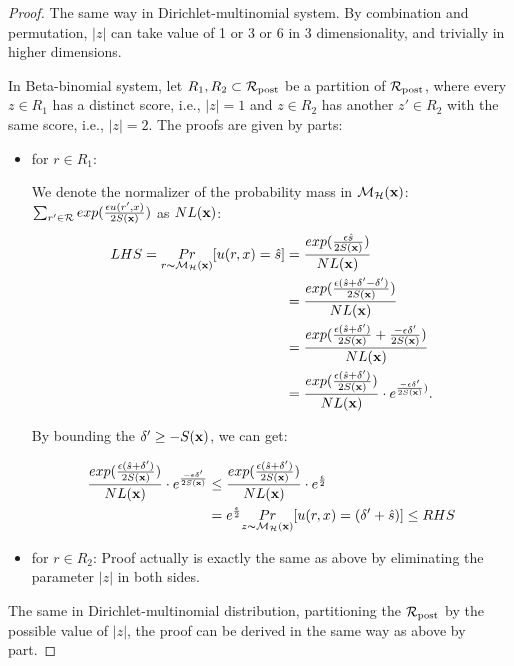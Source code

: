 \documentclass{article}
\begin{document}
\begin{proof}
 The same way in Dirichlet-multinomial system. By combination and permutation, $|z|$ can take value of 1 or 3 or 6 in 3 dimensionality, and trivially in higher dimensions.

 In Beta-binomial system, let $R_1, R_2 \subset \mathcal{R}_{\textup{post}}$ be a partition of $\mathcal{R}_{\textup{post}}$, where every $z \in R_1$ has a distinct score, i.e., $|z| = 1$ and $z \in R_2$ has another $z' \in R_2$ with the same score, i.e., $|z| = 2$. The proofs are given by parts: 

 \begin{itemize}
 	\item for $r \in R_1$:

		We denote the normalizer of the probability mass in $\mathcal{M}_{\mathcal{H}}(\textbf{x})$: $\sum_{r' \in \mathcal{R}}exp(\frac{\epsilon u(r',x)}{2 S(\textbf{x})})$ as $NL(\textbf{x})$:
		\begin{equation*}
		\begin{split}
		LHS 
		  = \underset{r \thicksim \mathcal{M}_{\mathcal{H}}(\textbf{x})}{Pr}[u(r,x) = \hat{s}]
		& = \frac{exp(\frac{\epsilon \hat{s}}{2 S(\textbf{x})})}{NL(\textbf{x})}\\
		& = \frac{exp(\frac{\epsilon (\hat{s} + \delta' - \delta')}{2 S(\textbf{x})})}{NL(\textbf{x})}\\
		& = \frac{exp(\frac{\epsilon (\hat{s} + \delta')}{2 S(\textbf{x})} + \frac{- \epsilon \delta'}{2 S(\textbf{x})})}{NL(\textbf{x})}\\
		& = \frac{exp(\frac{\epsilon (\hat{s} + \delta')}{2 S(\textbf{x})})}{NL(\textbf{x})} \cdot e^{\frac{- \epsilon \delta'}{2 S(\textbf{x})})}.\\
		\end{split}
		\end{equation*}

		By bounding the $\delta' \geq -S(\textbf{x})$, we can get:

		\begin{equation*}
		\begin{split}
		\frac{exp(\frac{\epsilon (\hat{s} + \delta')}{2 S(\textbf{x})})}{NL(\textbf{x})} \cdot e^{\frac{- \epsilon \delta'}{2 S(\textbf{x})}}
		& \leq \frac{exp(\frac{\epsilon (\hat{s} + \delta')}{2 S(\textbf{x})})}{NL(\textbf{x})} \cdot e^{\frac{\epsilon}{2}}\\
		&  =  e^{\frac{\epsilon}{2}} \underset{z \thicksim \mathcal{M}_{\mathcal{H}}(\textbf{x})}{Pr}[u(r,x) = (\delta' + \hat{s})] \leq RHS\\
		\end{split}
		\end{equation*}
	\item for $r \in R_2$: Proof actually is exactly the same as above by eliminating the parameter $|z|$ in both sides.
\end{itemize}

The same in Dirichlet-multinomial distribution, partitioning the $\mathcal{R}_{\textup{post}}$ by the possible value of $|z|$, the proof can be derived in the same way as above by part.

\end{proof}
\end{document}
